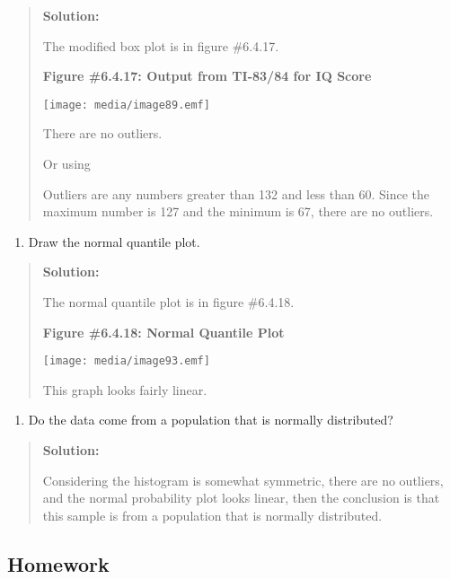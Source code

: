 \documentclass[]{book}
\providecommand{\tightlist}{%
  \setlength{\itemsep}{0pt}\setlength{\parskip}{0pt}}
\begin{document}
\begin{quote}
\textbf{Solution:}

The modified box plot is in figure \#6.4.17.

\textbf{Figure \#6.4.17: Output from TI-83/84 for IQ Score}

\texttt{[image: media/image89.emf]}

There are no outliers.

Or using

Outliers are any numbers greater than 132 and less than 60. Since the
maximum number is 127 and the minimum is 67, there are no outliers.
\end{quote}

\begin{enumerate}
\def\labelenumi{\alph{enumi}.}
\setcounter{enumi}{3}
\tightlist
\item
  Draw the normal quantile plot.
\end{enumerate}

\begin{quote}
\textbf{Solution:}

The normal quantile plot is in figure \#6.4.18.

\textbf{Figure \#6.4.18: Normal Quantile Plot}

\texttt{[image: media/image93.emf]}

This graph looks fairly linear.
\end{quote}

\begin{enumerate}
\def\labelenumi{\alph{enumi}.}
\setcounter{enumi}{4}
\tightlist
\item
  Do the data come from a population that is normally distributed?
\end{enumerate}

\begin{quote}
\textbf{Solution:}

Considering the histogram is somewhat symmetric, there are no
outliers, and the normal probability plot looks linear, then the
conclusion is that this sample is from a population that is normally
distributed.
\end{quote}

\hypertarget{homework-18}{%
\subsection{Homework}\label{homework-18}}
\end{document}
